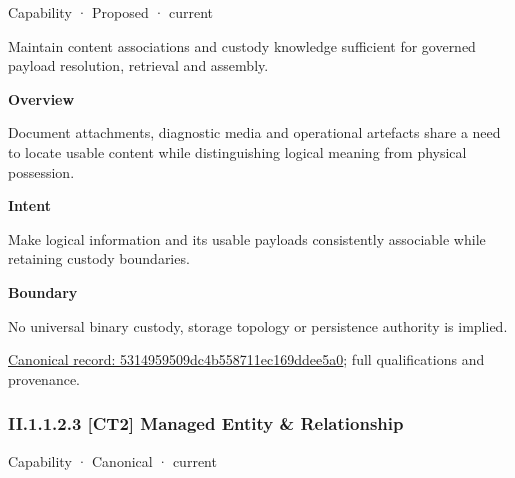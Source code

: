 \label{element:5314959509dc4b558711ec169ddee5a0}
{\small Capability · Proposed · current}\par

Maintain content associations and custody knowledge sufficient for governed payload resolution, retrieval and assembly.



\textbf{Overview}



Document attachments, diagnostic media and operational artefacts share a need to locate usable content while distinguishing logical meaning from physical possession.



\textbf{Intent}



Make logical information and its usable payloads consistently associable while retaining custody boundaries.



\textbf{Boundary}



No universal binary custody, storage topology or persistence authority is implied.


{\footnotesize \href{../../../../../../../continuum/strategy/capability/5314959509dc4b558711ec169ddee5a0.md}{Canonical record: 5314959509dc4b558711ec169ddee5a0}; full qualifications and provenance.}\par
\subsubsection*{II.1.1.2.3 [CT2] Managed Entity \& Relationship}
\label{navigation:II.1.1.2.3}

\label{element:910634fb1621416c818a022ab0b5d3a1}
{\small Capability · Canonical · current}\par

